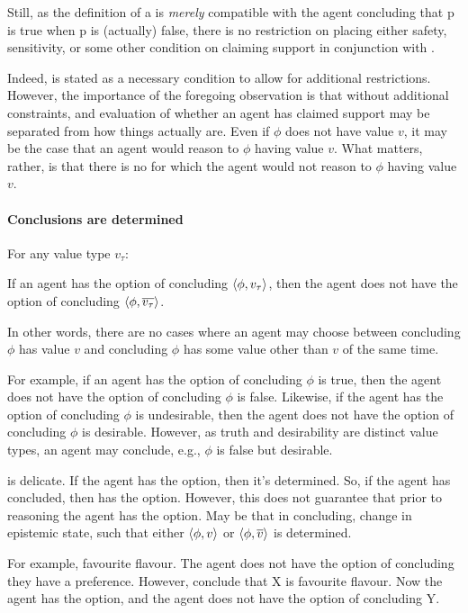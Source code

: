 \begin{note}
  Still, as the definition of a \sink{} is \emph{merely} compatible with the agent concluding that p is true when p is (actually) false, there is no restriction on placing either safety, sensitivity, or some other condition on claiming support in conjunction with \ideaS{}.

  Indeed, \ideaS{} is stated as a necessary condition to allow for additional restrictions.
  However, the importance of the foregoing observation is that without additional constraints, and evaluation of whether an agent has claimed support may be separated from how things actually are.
  Even if \(\phi\) does not have value \(v\), it may be the case that an agent would reason to \(\phi\) having value \(v\).
  What matters, rather, is that there is no \epPN{} for which the agent would not reason to \(\phi\) having value \(v\).
\end{note}

\paragraph*{Conclusions are determined}

\begin{note}
  \begin{assumption}
    \label{assu:conc:determined}
    For any value type \(v_{\tau}\):

    If an agent has the option of concluding \(\langle \phi, v_{\tau} \rangle\), then the agent does not have the option of concluding \(\langle \phi, \overline{v_{\tau}} \rangle\).
  \end{assumption}

  In other words, there are no cases where an agent may choose between concluding \(\phi\) has value \(v\) and concluding \(\phi\) has some value other than \(v\) of the same time.

  For example, if an agent has the option of concluding \(\phi\) is true, then the agent does not have the option of concluding \(\phi\) is false.
  Likewise, if the agent has the option of concluding \(\phi\) is undesirable, then the agent does not have the option of concluding \(\phi\) is desirable.
  However, as truth and desirability are distinct value types, an agent may conclude, e.g., \(\phi\) is false but desirable.
\end{note}

\begin{note}
   is delicate.
  If the agent has the option, then it's determined.
  So, if the agent has concluded, then has the option.
  However, this does not guarantee that prior to reasoning the agent has the option.
  May be that in concluding, change in epistemic state, such that either \(\langle \phi, v \rangle\) or \(\langle \phi, \overline{v} \rangle\) is determined.

  For example, favourite flavour.
  The agent does not have the option of concluding they have a preference.
  However, conclude that X is favourite flavour.
  Now the agent has the option, and the agent does not have the option of concluding Y.
\end{note}

